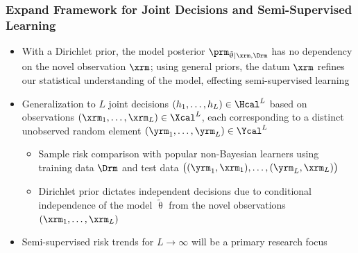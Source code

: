 \documentclass[aspectratio=169,usenames,dvipsnames]{beamer}
\begin{document}
\begin{frame}
\frametitle{Expand Framework for Joint Decisions and Semi-Supervised Learning}

\begin{itemize}
\item With a Dirichlet prior, the model posterior $\prm_{\tilde{\uptheta} | \xrm,\Drm}$ has no dependency on the novel observation $\xrm$; using general priors, the datum $\xrm$ refines our statistical understanding of the model, effecting \alert{semi-supervised} learning 
\vspace{0.5em}
\item Generalization to $L$ joint decisions $(h_1,\ldots,h_L) \in \Hcal^L$ based on observations $(\xrm_1,\ldots,\xrm_L) \in \Xcal^L$, each corresponding to a distinct unobserved random element $(\yrm_1,\ldots,\yrm_L) \in \Ycal^L$
\vspace{0.25em}
	\begin{itemize}
	\item \alert{Sample risk} comparison with popular non-Bayesian learners using training data $\Drm$ and test data $\big( (\yrm_1,\xrm_1),\ldots,(\yrm_L,\xrm_L)\big)$
	\vspace{0.25em}
	\item Dirichlet prior dictates \alert{independent decisions} due to conditional independence of the model $\tilde{\uptheta}$ from the novel observations $(\xrm_1,\ldots,\xrm_L)$
	\end{itemize}
\vspace{0.5em}
\item Semi-supervised risk trends for $L \to \infty$ will be a primary research focus
\end{itemize}

\end{frame}


%
\end{document}

